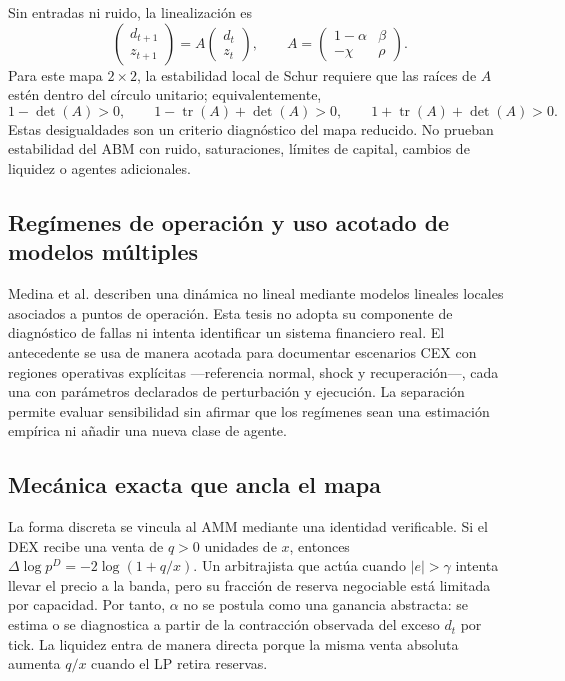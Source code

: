 \documentclass[11pt,a4paper]{article}
\begin{document}
Sin entradas ni ruido, la linealización es
\begin{equation}
\begin{pmatrix}d_{t+1}\\z_{t+1}\end{pmatrix}=
A\begin{pmatrix}d_t\\z_t\end{pmatrix},\qquad
A=\begin{pmatrix}1-\alpha&\beta\\-\chi&\rho\end{pmatrix}.
\end{equation}
Para este mapa $2\times2$, la estabilidad local de Schur requiere que las raíces de $A$ estén dentro del círculo unitario; equivalentemente,
\begin{equation}
1-\det(A)>0,\qquad 1-\operatorname{tr}(A)+\det(A)>0,\qquad 1+\operatorname{tr}(A)+\det(A)>0.
\end{equation}
Estas desigualdades son un criterio diagnóstico del mapa reducido. No prueban estabilidad del ABM con ruido, saturaciones, límites de capital, cambios de liquidez o agentes adicionales.
\subsection{Regímenes de operación y uso acotado de modelos múltiples}
Medina et al. \cite{medina2009} describen una dinámica no lineal mediante modelos lineales locales asociados a puntos de operación. Esta tesis no adopta su componente de diagnóstico de fallas ni intenta identificar un sistema financiero real. El antecedente se usa de manera acotada para documentar escenarios CEX con regiones operativas explícitas ---referencia normal, shock y recuperación---, cada una con parámetros declarados de perturbación y ejecución. La separación permite evaluar sensibilidad sin afirmar que los regímenes sean una estimación empírica ni añadir una nueva clase de agente.
\subsection{Mecánica exacta que ancla el mapa}
La forma discreta se vincula al AMM mediante una identidad verificable. Si el DEX recibe una venta de $q>0$ unidades de $x$, entonces $\Delta\log p^D=-2\log(1+q/x)$. Un arbitrajista que actúa cuando $|e|>\gamma$ intenta llevar el precio a la banda, pero su fracción de reserva negociable está limitada por capacidad. Por tanto, $\alpha$ no se postula como una ganancia abstracta: se estima o se diagnostica a partir de la contracción observada del exceso $d_t$ por tick. La liquidez entra de manera directa porque la misma venta absoluta aumenta $q/x$ cuando el LP retira reservas.
\end{document}
